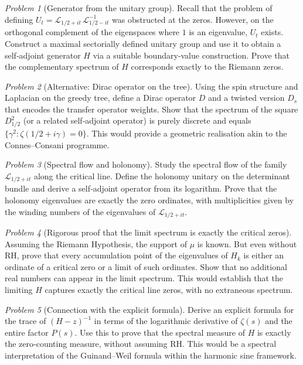\documentclass[11pt,a4paper]{article}
\theoremstyle{remark}
\newtheorem{problem}{Problem}[section]
\newcommand{\cL}{\mathcal{L}}
\begin{document}
\begin{problem}[Generator from the unitary group]
Recall that the problem of defining $U_t = \cL_{1/2+it}\,\cL_{1/2-it}^{-1}$ was obstructed at the zeros. However, on the orthogonal complement of the eigenspaces where $1$ is an eigenvalue, $U_t$ exists. Construct a maximal sectorially defined unitary group and use it to obtain a self‑adjoint generator $H$ via a suitable boundary‑value construction. Prove that the complementary spectrum of $H$ corresponds exactly to the Riemann zeros.
\end{problem}

\begin{problem}[Alternative: Dirac operator on the tree]
Using the spin structure and Laplacian on the greedy tree, define a Dirac operator $D$ and a twisted version $D_s$ that encodes the transfer operator weights. Show that the spectrum of the square $D_{1/2}^2$ (or a related self‑adjoint operator) is purely discrete and equals $\{\gamma^2:\zeta(1/2+i\gamma)=0\}$. This would provide a geometric realisation akin to the Connes–Consani programme.
\end{problem}

\begin{problem}[Spectral flow and holonomy]
Study the spectral flow of the family $\cL_{1/2+it}$ along the critical line. Define the holonomy unitary on the determinant bundle and derive a self‑adjoint operator from its logarithm. Prove that the holonomy eigenvalues are exactly the zero ordinates, with multiplicities given by the winding numbers of the eigenvalues of $\cL_{1/2+it}$.
\end{problem}

\begin{problem}[Rigorous proof that the limit spectrum is exactly the critical zeros]
Assuming the Riemann Hypothesis, the support of $\mu$ is known. But even without RH, prove that every accumulation point of the eigenvalues of $H_k$ is either an ordinate of a critical zero or a limit of such ordinates. Show that no additional real numbers can appear in the limit spectrum. This would establish that the limiting $H$ captures exactly the critical line zeros, with no extraneous spectrum.
\end{problem}

\begin{problem}[Connection with the explicit formula]
Derive an explicit formula for the trace of $(H-z)^{-1}$ in terms of the logarithmic derivative of $\zeta(s)$ and the entire factor $P(s)$. Use this to prove that the spectral measure of $H$ is exactly the zero‑counting measure, without assuming RH. This would be a spectral interpretation of the Guinand–Weil formula within the harmonic sine framework.
\end{problem}
\end{document}
